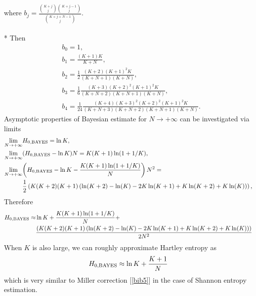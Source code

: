 \documentclass[a4paper,10pt]{article}
\begin{document}
where $b_{j}=\frac{{K+j \choose j}{K+j-1 \choose j}}{{K+j+N-1 \choose j}}$.\\
\\*
Then 
\begin{equation} 
\label{eq:beval}
\begin{split}
& b_{0} = 1, \\
& b_{1} = \frac{(K+1)K}{K+N}, \\
& b_{2} = \frac{1}{2}\frac{(K+2)(K+1)^2K}{(K+N+1)(K+N)}, \\
& b_{3} = \frac{1}{6}\frac{(K+3)(K+2)^2(K+1)^2K}{(K+N+2)(K+N+1)(K+N)}, \\
& b_{4} = \frac{1}{24}\frac{(K+4)(K+3)^2(K+2)^2(K+1)^2K}{(K+N+3)(K+N+2)(K+N+1)(K+N)}.
\end{split}
\end{equation}
Asymptotic properties of Bayesian estimate for $N \rightarrow +\infty$ can be investigated via limits
\begin{equation} 
\label{eq:lim}
\begin{split}
\lim_{N \rightarrow +\infty} & {H_{0,\mbox{\scriptsize{BAYES}}}} = \ln{K}, \\
\lim_{N \rightarrow +\infty} & {(H_{0,\mbox{\scriptsize{BAYES}}}-\ln{K})N} = K(K+1)\ln(1+1/K), \\
\lim_{N \rightarrow +\infty} & {\left(H_{0,\mbox{\scriptsize{BAYES}}}-\ln{K}-\frac{K(K+1)\ln(1+1/K)}{N}\right)N^2} = \\
& \frac{1}{2}\left(K(K+2)(K+1)\left(\ln(K+2)-\ln(K)-2K\ln(K+1)+K\ln(K+2)+K\ln(K)\right)\right),
\end{split}
\end{equation}
Therefore
\begin{equation} 
\label{eq:hroz}
\begin{split}
H_{0,\mbox{\scriptsize{BAYES}}} \approx & \ln{K} + \frac{K(K+1)\ln(1+1/K)}{N} + \\ 
& \frac{\left(K(K+2)(K+1)\left(\ln(K+2)-\ln(K)-2K\ln(K+1)+K\ln(K+2)+K\ln(K)\right)\right)}{2N^2}
\end{split}
\end{equation}
When $K$ is also large, we can roughly approximate Hartley entropy as
\begin{equation} 
\label{eq:hartapp}
H_{0,\mbox{\scriptsize{BAYES}}} \approx \ln{K} + \frac{K+1}{N}
\end{equation}
which is very similar to Miller correction [\ref{bib5}] in the case of Shannon entropy estimation.
\end{document}
